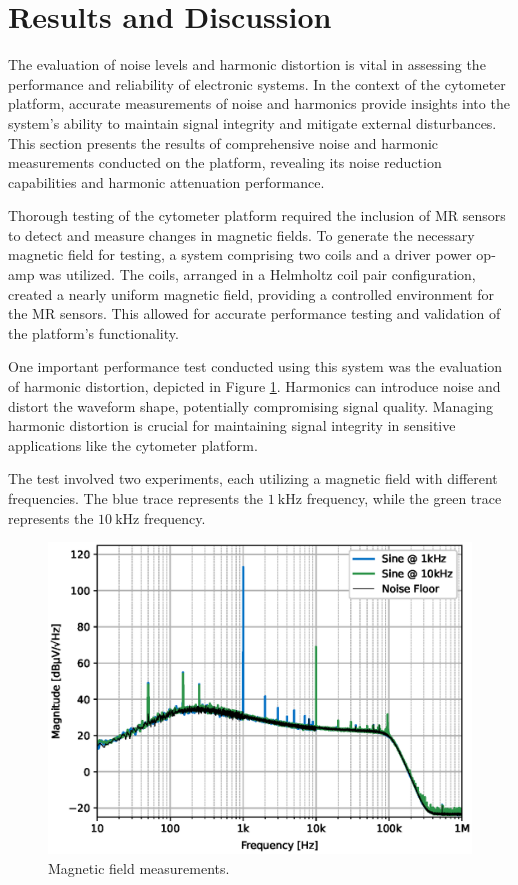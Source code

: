 \section{Results and Discussion}
\label{sec:res-disc}

The evaluation of noise levels and harmonic distortion is vital in assessing the performance and reliability of electronic systems. In the context of the cytometer platform, accurate measurements of noise and harmonics provide insights into the system's ability to maintain signal integrity and mitigate external disturbances. This section presents the results of comprehensive noise and harmonic measurements conducted on the platform, revealing its noise reduction capabilities and harmonic attenuation performance.


Thorough testing of the cytometer platform required the inclusion of MR sensors to detect and measure changes in magnetic fields. To generate the necessary magnetic field for testing, a system comprising two coils and a driver power op-amp was utilized. The coils, arranged in a Helmholtz coil pair configuration, created a nearly uniform magnetic field, providing a controlled environment for the MR sensors. This allowed for accurate performance testing and validation of the platform's functionality.

One important performance test conducted using this system was the evaluation of harmonic distortion, depicted in Figure \ref{fig:harmonics}. Harmonics can introduce noise and distort the waveform shape, potentially compromising signal quality. Managing harmonic distortion is crucial for maintaining signal integrity in sensitive applications like the cytometer platform. 

The test involved two experiments, each utilizing a magnetic field with different frequencies. The blue trace represents the $\mathrm{1~kHz}$ frequency, while the green trace represents the $\mathrm{10~kHz}$ frequency.

\begin{figure}[!ht]
    \centering
    \includegraphics[width=.475\textwidth]{figs/harmonics.eps}
    \caption{Magnetic field measurements.}
    \label{fig:harmonics}
\end{figure}

